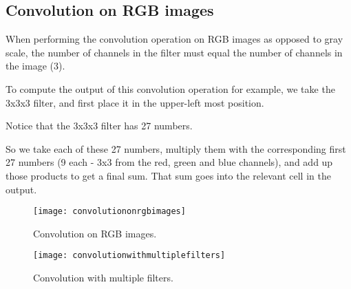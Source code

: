 	\subsection{Convolution on RGB images}
	\begin{bulletedlist}
		\item When performing the convolution operation on RGB images as opposed to gray scale, the number of channels in the filter must equal the number of channels in the image (3).
		\item To compute the output of this convolution operation for example, we take the 3x3x3 filter, and first place it in the upper-left most position.
		\item Notice that the 3x3x3 filter has 27 numbers.
		\item So we take each of these 27 numbers, multiply them with the corresponding first 27 numbers (9 each - 3x3 from the red, green and blue channels), and add up those products to get a final sum.  That sum goes into the relevant cell in the output.
	\end{bulletedlist}

	\begin{figure}[htb]
		\centering
		\texttt{[image: convolutiononrgbimages]}
		\caption[Convolution on RGB images]{Convolution on RGB images.}
		\label{fig:convolutiononrgbimages}
	\end{figure}
	\begin{figure}[htb]
		\centering
		\texttt{[image: convolutionwithmultiplefilters]}
		\caption[Convolution with multiple filters]{Convolution with multiple filters.}
		\label{fig:convolutionwithmultiplefilters}
	\end{figure}


